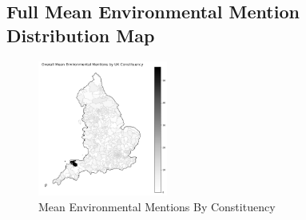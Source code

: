 \documentclass[12pt,letterpaper]{article}
\begin{document}
\subsection{Full Mean Environmental Mention Distribution Map}

\begin{figure}[H]
	\centering
	\includegraphics[width=0.38\textwidth]{plots/Overall_Environmental_Mentions.png}
	\caption{Mean Environmental Mentions By Constituency}
	\label{fig:meanenvbyconold}
\end{figure}







\newpage
	
\printbibliography
	
\end{document}

